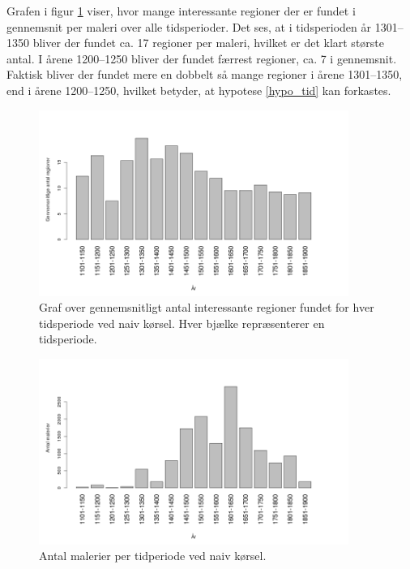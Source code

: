 {Grafen i figur \ref{naiv_year} viser, hvor mange interessante regioner
der er fundet i gennemsnit per maleri over alle tidsperioder. Det ses,
at i tidsperioden år 1301--1350 bliver der fundet ca. 17 regioner per
maleri, hvilket er det klart største antal. I årene 1200--1250 bliver
der fundet færrest regioner, ca. 7 i gennemsnit. Faktisk bliver der
fundet mere en dobbelt så mange regioner i årene 1301--1350, end i årene
1200--1250, hvilket betyder, at hypotese \ref{hypo_tid} kan forkastes.

\begin{figure}[!h]
	\centering
	\includegraphics[angle=0,width=0.90\textwidth]{afsnit/resultater/billeder/yearcut.png}
    \caption{Graf over gennemsnitligt antal interessante regioner fundet
    for hver tidsperiode ved naiv kørsel. Hver bjælke repræsenterer en
    tidsperiode.}
	\label{naiv_year}
\end{figure}

\begin{figure}[!h]
	\centering
	\includegraphics[angle=0,width=0.90\textwidth]{afsnit/resultater/billeder/yearNrImage.png}
	\caption{Antal malerier per tidperiode ved naiv kørsel.}
	\label{naiv_yearNrImage}
\end{figure}

}
